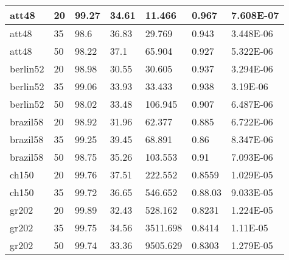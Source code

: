 \documentclass{llncs}
\begin{document}
\begin{center}
\begin{longtable}{|l|l|l|l|l|l|l|}
\hline	att48	&	20	&	99.27	&	34.61	&	11.466	&	0.967	&	7.608E-07	\\
\hline	att48	&	35	&	98.6	&	36.83	&	29.769	&	0.943	&	3.448E-06	\\
\hline	att48	&	50	&	98.22	&	37.1	&	65.904	&	0.927	&	5.322E-06	\\
\hline	berlin52	&	20	&	98.98	&	30.55	&	30.605	&	0.937	&	3.294E-06	\\
\hline	berlin52	&	35	&	99.06	&	33.93	&	33.433	&	0.938	&	3.19E-06	\\
\hline	berlin52	&	50	&	98.02	&	33.48	&	106.945	&	0.907	&	6.487E-06	\\
\hline	brazil58	&	20	&	98.92	&	31.96	&	62.377	&	0.885	&	6.722E-06	\\
\hline	brazil58	&	35	&	99.25	&	39.45	&	68.891	&	0.86	&	8.347E-06	\\
\hline	brazil58	&	50	&	98.75	&	35.26	&	103.553	&	0.91	&	7.093E-06	\\
\hline	ch150	&	20	&	99.76	&	37.51	&	222.552	&	0.8559	&	1.029E-05	\\
\hline	ch150	&	35	&	99.72	&	36.65	&	546.652	&	0.88.03	&	9.033E-05	\\
\hline	gr202	&	20	&	99.89	&	32.43	&	528.162	&	0.8231	&	1.224E-05	\\
\hline	gr202	&	35	&	99.75	&	34.56	&	3511.698	&	0.8414	&	1.11E-05	\\
\hline	gr202	&	50	&	99.74	&	33.36	&	9505.629	&	0.8303	&	1.279E-05	\\

\end{longtable}
\end{center}
\end{document}
